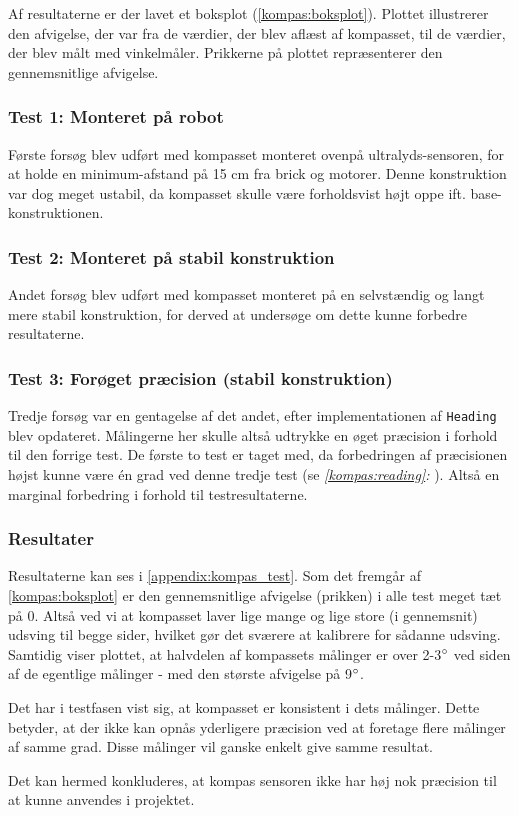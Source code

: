 Af resultaterne er der lavet et boksplot (\cref{kompas:boksplot}).
Plottet illustrerer den afvigelse, der var fra de værdier, der blev aflæst af kompasset, til de værdier, der blev målt med vinkelmåler.
Prikkerne på plottet repræsenterer den gennemsnitlige afvigelse.



\subsubsection{Test 1: Monteret på robot}
Første forsøg blev udført med kompasset monteret ovenpå ultralyds-sensoren, for at holde en minimum-afstand på 15 cm fra brick og motorer.
Denne konstruktion var dog meget ustabil, da kompasset skulle være forholdsvist højt oppe ift. base-konstruktionen.

\subsubsection{Test 2: Monteret på stabil konstruktion}
Andet forsøg blev udført med kompasset monteret på en selvstændig og langt mere stabil konstruktion, for derved at undersøge om dette kunne forbedre resultaterne.

\subsubsection{Test 3: Forøget præcision (stabil konstruktion)}
Tredje forsøg var en gentagelse af det andet, efter implementationen af \lstinline[style=csharp]!Heading! blev opdateret.
Målingerne her skulle altså udtrykke en øget præcision i forhold til den forrige test.
De første to test er taget med, da forbedringen af præcisionen højst kunne være \'en grad ved denne tredje test (se \textit{\cref{kompas:reading}: }).
Altså en marginal forbedring i forhold til testresultaterne.

\subsubsection{Resultater}
Resultaterne kan ses i \cref{appendix:kompas_test}. Som det fremgår af \cref{kompas:boksplot} er den gennemsnitlige afvigelse (prikken) i alle test meget tæt på 0.
Altså ved vi at kompasset laver lige mange og lige store (i gennemsnit) udsving til begge sider, hvilket gør det sværere at kalibrere for sådanne udsving.
Samtidig viser plottet, at halvdelen af kompassets målinger er over 2-3$^\circ$ ved siden af de egentlige målinger - med den største afvigelse på 9$^\circ$.

Det har i testfasen vist sig, at kompasset er konsistent i dets målinger.
Dette betyder, at der ikke kan opnås yderligere præcision ved at foretage flere målinger af samme grad.
Disse målinger vil ganske enkelt give samme resultat.

Det kan hermed konkluderes, at kompas sensoren ikke har høj nok præcision til at kunne anvendes i projektet.

